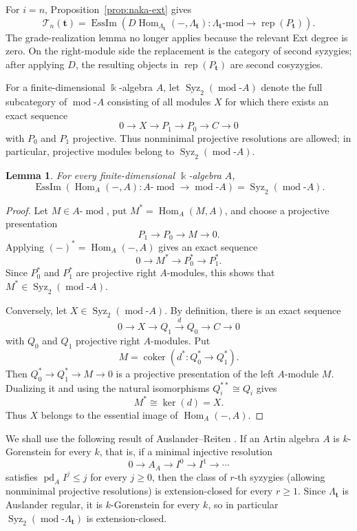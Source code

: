 \documentclass[12pt,reqno]{amsart}
\newtheorem{lemma}[theorem]{Lemma}
\theoremstyle{definition}
\theoremstyle{remark}
\newcommand{\Rep}{\operatorname{rep}}
\newcommand{\Hom}{\operatorname{Hom}}
\newcommand{\EssIm}{\operatorname{EssIm}}
\newcommand{\modcat}{\operatorname{mod}}
\begin{document}
For $i=n$, Proposition~\ref{prop:naka-ext} gives
\[
\mathcal T_n(\mathbf t)
=
\EssIm\left(
D\Hom_{\Lambda_{\mathbf t}}(-,\Lambda_{\mathbf t})
:\Lambda_{\mathbf t}\text{-mod}\longrightarrow\Rep(P_{\mathbf t})
\right).
\]
The grade-realization lemma no longer applies because the relevant Ext degree
is zero.  On the right-module side the replacement is the category of second
syzygies; after applying $D$, the resulting objects in
$\Rep(P_{\mathbf t})$ are second cosyzygies.

For a finite-dimensional $\Bbbk$-algebra $A$, let
$\operatorname{Syz}_2(\modcat\text{-}A)$ denote the full subcategory of
$\modcat\text{-}A$ consisting of all modules $X$ for which there exists an
exact sequence
$$
0\longrightarrow X\longrightarrow P_1\longrightarrow P_0
\longrightarrow C\longrightarrow0
$$
with $P_0$ and $P_1$ projective.  Thus nonminimal projective resolutions are
allowed; in particular, projective modules belong to
$\operatorname{Syz}_2(\modcat\text{-}A)$.

\begin{lemma}\label{lem:dual-syzygy}
For every finite-dimensional $\Bbbk$-algebra $A$,
$$
\EssIm\!\left(
\Hom_A(-,A):A\text{-}\modcat\longrightarrow\modcat\text{-}A
\right)
=
\operatorname{Syz}_2(\modcat\text{-}A).
$$
\end{lemma}

\begin{proof}
Let $M\in A\text{-}\modcat$, put $M^*=\Hom_A(M,A)$, and choose a projective
presentation
$$
P_1\longrightarrow P_0\longrightarrow M\longrightarrow0.
$$
Applying $(-)^*=\Hom_A(-,A)$ gives an exact sequence
$$
0\longrightarrow M^*\longrightarrow P_0^*\longrightarrow P_1^*.
$$
Since $P_0^*$ and $P_1^*$ are projective right $A$-modules, this shows that
$M^*\in\operatorname{Syz}_2(\modcat\text{-}A)$.

Conversely, let $X\in\operatorname{Syz}_2(\modcat\text{-}A)$.  By definition,
there is an exact sequence
$$
0\longrightarrow X\longrightarrow Q_1\xrightarrow{d}Q_0
\longrightarrow C\longrightarrow0
$$
with $Q_0$ and $Q_1$ projective right $A$-modules.  Put
$$
M=\operatorname{coker}(d^*:Q_0^*\longrightarrow Q_1^*).
$$
Then $Q_0^*\to Q_1^*\to M\to0$ is a projective presentation of the left
$A$-module $M$.  Dualizing it and using the natural isomorphisms
$Q_i^{**}\cong Q_i$ gives
$$
M^*\cong\ker(d)=X.
$$
Thus $X$ belongs to the essential image of $\Hom_A(-,A)$.
\end{proof}

We shall use the following result of Auslander--Reiten \cite{ARsyzygy}.  If an Artin algebra $A$ is $k$-Gorenstein for every $k$, that is, if a minimal injective resolution
\[
0\longrightarrow A_A\longrightarrow I^0\longrightarrow I^1\longrightarrow\cdots
\]
satisfies $\operatorname{pd}_A I^j\le j$ for every $j\ge0$, then
the class of $r$-th syzygies (allowing nonminimal projective resolutions) is extension-closed for every $r\ge1$.
Since $\Lambda_{\mathbf t}$ is Auslander regular, it is $k$-Gorenstein for every $k$, so in particular
$\operatorname{Syz}_2(\modcat\text{-}\Lambda_{\mathbf t})$ is extension-closed.
\end{document}
